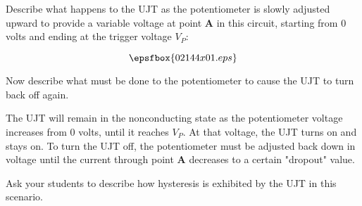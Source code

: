 

Describe what happens to the UJT as the potentiometer is slowly adjusted upward to provide a variable voltage at point {\bf A} in this circuit, starting from 0 volts and ending at the trigger voltage $V_P$:

$$\epsfbox{02144x01.eps}$$

Now describe what must be done to the potentiometer to cause the UJT to turn back off again.







The UJT will remain in the nonconducting state as the potentiometer voltage increases from 0 volts, until it reaches $V_P$.  At that voltage, the UJT turns on and stays on.  To turn the UJT off, the potentiometer must be adjusted back down in voltage until the current through point {\bf A} decreases to a certain "dropout" value.







Ask your students to describe how hysteresis is exhibited by the UJT in this scenario.




